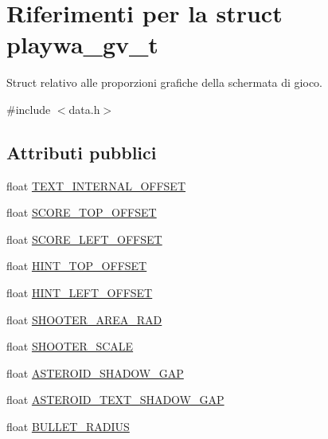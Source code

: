 \hypertarget{structplaywa__gv__t}{}\section{Riferimenti per la struct playwa\+\_\+gv\+\_\+t}
\label{structplaywa__gv__t}


Struct relativo alle proporzioni grafiche della schermata di gioco.  




{\ttfamily \#include $<$data.\+h$>$}

\subsection*{Attributi pubblici}
\begin{DoxyCompactItemize}
\item 
float \hyperlink{structplaywa__gv__t_ad30a4c3bd9651045d2cd4c0f31241835}{T\+E\+X\+T\+\_\+\+I\+N\+T\+E\+R\+N\+A\+L\+\_\+\+O\+F\+F\+S\+ET}
\item 
float \hyperlink{structplaywa__gv__t_a6ca3c721f2842ece4c64796688e835de}{S\+C\+O\+R\+E\+\_\+\+T\+O\+P\+\_\+\+O\+F\+F\+S\+ET}
\item 
float \hyperlink{structplaywa__gv__t_a5701836d1035f6072d2c6a390b5fd899}{S\+C\+O\+R\+E\+\_\+\+L\+E\+F\+T\+\_\+\+O\+F\+F\+S\+ET}
\item 
float \hyperlink{structplaywa__gv__t_a3ae70941d7095abc116b2a9963e270c4}{H\+I\+N\+T\+\_\+\+T\+O\+P\+\_\+\+O\+F\+F\+S\+ET}
\item 
float \hyperlink{structplaywa__gv__t_a9e43e88c69f818e1e9578fcd611636fa}{H\+I\+N\+T\+\_\+\+L\+E\+F\+T\+\_\+\+O\+F\+F\+S\+ET}
\item 
float \hyperlink{structplaywa__gv__t_a1786b953048491d8c8c026fa9d9b5043}{S\+H\+O\+O\+T\+E\+R\+\_\+\+A\+R\+E\+A\+\_\+\+R\+AD}
\item 
float \hyperlink{structplaywa__gv__t_a37c87ae70576bc6643be59b56ba8b5a9}{S\+H\+O\+O\+T\+E\+R\+\_\+\+S\+C\+A\+LE}
\item 
float \hyperlink{structplaywa__gv__t_a14e9ed05d22c8948d9039eb0ce695b0a}{A\+S\+T\+E\+R\+O\+I\+D\+\_\+\+S\+H\+A\+D\+O\+W\+\_\+\+G\+AP}
\item 
float \hyperlink{structplaywa__gv__t_a3a4ac88416c4ca6c736053b84f36075f}{A\+S\+T\+E\+R\+O\+I\+D\+\_\+\+T\+E\+X\+T\+\_\+\+S\+H\+A\+D\+O\+W\+\_\+\+G\+AP}
\item 
float \hyperlink{structplaywa__gv__t_a29cbe190c15da1bf361981bc3452db21}{B\+U\+L\+L\+E\+T\+\_\+\+R\+A\+D\+I\+US}

\end{DoxyCompactItemize}
